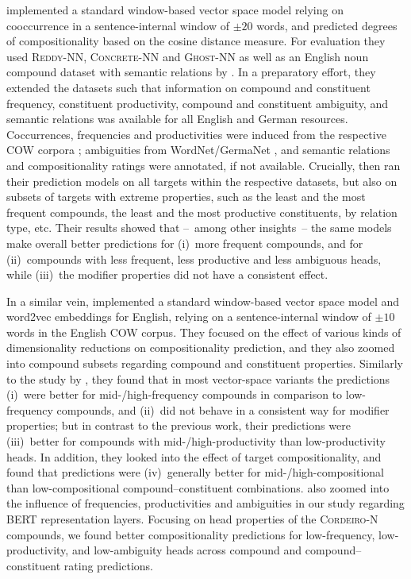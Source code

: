 \documentclass[output=paper,colorlinks,citecolor=brown]{langscibook}
\begin{document}
\citet{SchulteImWaldeEtAl:16b} implemented a standard window-based vector space model relying on cooccurrence in a sentence-internal window of $\pm 20$ words, and predicted degrees of compositionality based on the cosine distance measure. For evaluation they used \textsc{Reddy-NN, Concrete-NN} and \textsc{Ghost-NN} as well as an English noun compound dataset with semantic relations by \citet{OSeaghdha:07}. In a preparatory effort, they extended the datasets such that information on compound and constituent frequency, constituent productivity, compound and constituent ambiguity, and semantic relations was available for all English and German resources. Coccurrences, frequencies and productivities were induced from the respective \textsc{COW} corpora \citep{Schaefer/Bildhauer:12,Schaefer:15}; ambiguities from WordNet/GermaNet \citep{Fellbaum:98, Hamp/Feldweg:97, Kunze:00}, and semantic relations and compositionality ratings were annotated, if not available. Crucially, \citet{SchulteImWaldeEtAl:16b} then ran their prediction models on all targets within the respective datasets, but also on subsets of targets with extreme properties, such as the least and the most frequent compounds, the least and the most productive constituents, by relation type, etc. Their results showed that --~among other insights~-- the same models make overall better predictions for (i)~more frequent compounds, and for (ii)~compounds with less frequent, less productive and less ambiguous heads, while (iii)~the modifier properties did not have a consistent effect. 

In a similar vein, \citet{Alipoor/SchulteImWalde:20} implemented a standard window-based vector space model and word2vec embeddings for English, relying on a sentence-internal window of $\pm 10$ words in the English \textsc{COW} corpus. They focused on the effect of various kinds of dimensionality reductions on compositionality prediction, and they also zoomed into compound subsets regarding compound and constituent properties. Similarly to the study by \citet{SchulteImWaldeEtAl:16b}, they found that in most vector-space variants the predictions (i)~were better for mid-/high-frequency compounds in comparison to low-frequency compounds, and (ii)~did not behave in a consistent way for modifier properties; but in contrast to the previous work, their predictions were (iii)~better for compounds with mid-/high-productivity than low-productivity heads. In addition, they looked into the effect of target compositionality, and found that predictions were (iv)~generally better for mid-/high-compositional than low-compositional compound--constituent combinations. \citet{Miletic/SchulteImWalde:23} also zoomed into the influence of frequencies, productivities and ambiguities in our study regarding BERT representation layers. Focusing on head properties of the \textsc{Cordeiro-N} compounds, we found better compositionality predictions for low-frequency, low-productivity, and low-ambiguity heads across compound and compound--constituent rating predictions.\largerpage
\end{document}
